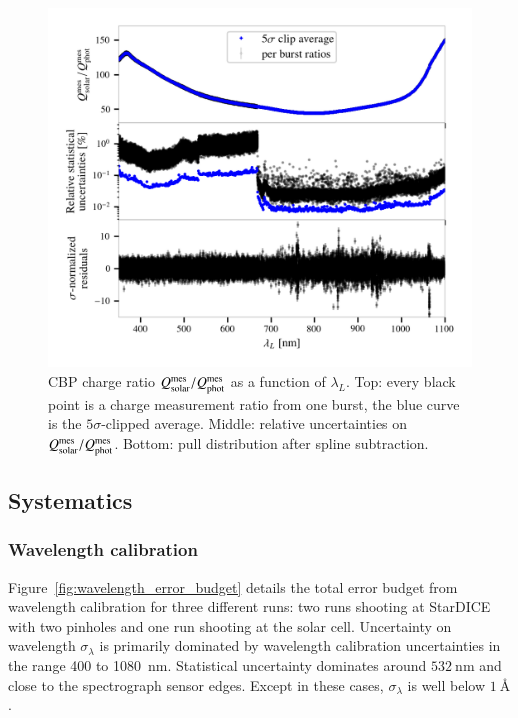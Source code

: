 \begin{figure}[!h]
\centering
\includegraphics[width=\columnwidth]{fig/cbp_charge_ratio.png}
\caption{CBP charge ratio $Q_{\mathrm{solar}}^{\mathrm{mes}}/Q_{\mathrm{phot}}^{\mathrm{mes}}$ as a function of $\lambda_L$. Top: every black point is a charge measurement ratio from one burst, the blue curve is the $5\sigma$-clipped average. Middle: relative uncertainties on $Q_{\mathrm{solar}}^{\mathrm{mes}}/Q_{\mathrm{phot}}^{\mathrm{mes}}$. Bottom: pull distribution after spline subtraction.}\label{fig:cbp_charge_ratio}
\end{figure}


\subsection{Systematics}



\subsubsection{Wavelength calibration}\label{sec:wavelength_syst}


Figure~\ref{fig:wavelength_error_budget} details the total error budget from wavelength calibration for three different runs: two runs shooting at StarDICE with two pinholes and one run shooting at the solar cell. Uncertainty on wavelength $\sigma_\lambda$ is primarily dominated by wavelength calibration uncertainties in the range 400 to \SI{1080}{\nm}. Statistical uncertainty dominates around $\SI{532}{\nm}$ and close to the spectrograph sensor edges. Except in these cases, $\sigma_\lambda$ is well below $\SI{1}{\angstrom}$.%

